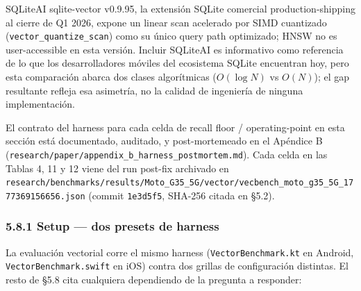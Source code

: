 SQLiteAI sqlite-vector v0.9.95, la extensión SQLite comercial
production-shipping al cierre de Q1 2026, expone un linear scan acelerado por
SIMD cuantizado (\texttt{vector\_quantize\_scan}) como su único query path
optimizado; HNSW no es user-accessible en esta versión. Incluir SQLiteAI es
informativo como referencia de lo que los desarrolladores móviles del ecosistema
SQLite encuentran hoy, pero esta comparación abarca dos clases algorítmicas
(\(O(\log N)\) vs \(O(N)\)); el gap resultante refleja esa asimetría, no la
calidad de ingeniería de ninguna implementación.

El contrato del harness para cada celda de recall floor / operating-point en
esta sección está documentado, auditado, y post-mortemeado en el Apéndice B
(\texttt{research/paper/appendix\_b\_harness\_postmortem.md}). Cada celda en las
Tablas 4, 11 y 12 viene del run post-fix archivado en
\texttt{research/benchmarks/results/Moto\_G35\_5G/vector/vecbench\_moto\_g35\_5G\_1777369156656.json}
(commit \texttt{1e3d5f5}, SHA-256 citada en §5.2).

\subsubsection{5.8.1 Setup --- dos presets de
harness}\label{setup-dos-presets-de-harness}

La evaluación vectorial corre el mismo harness (\texttt{VectorBenchmark.kt} en
Android, \texttt{VectorBenchmark.swift} en iOS) contra dos grillas de
configuración distintas. El resto de §5.8 cita cualquiera dependiendo de la
pregunta a responder:

